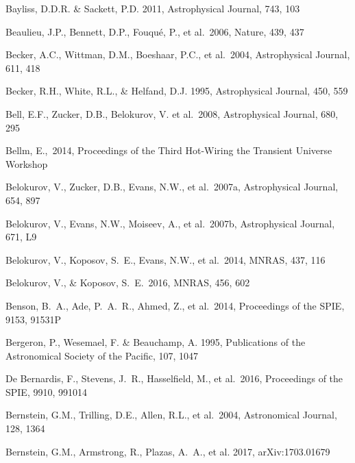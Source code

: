 \documentclass[twocolumn]{aastex61}
\begin{document}
\begin{thebibliography}{}
 Bayliss, D.D.R. \& Sackett, P.D. 2011, Astrophysical Journal, 743, 103

 Beaulieu, J.P., Bennett, D.P., Fouqu\'{e}, P., et al.~2006, Nature, 439, 437

 Becker, A.C., Wittman, D.M., Boeshaar, P.C., et al.~2004, Astrophysical Journal, 611, 418

 Becker, R.H., White, R.L., \& Helfand, D.J. 1995, Astrophysical Journal, 450, 559

 Bell, E.F., Zucker, D.B., Belokurov, V. et al.~2008, Astrophysical Journal, 680, 295

 Bellm, E.,~2014, Proceedings of the Third Hot-Wiring the Transient Universe Workshop

 Belokurov, V., Zucker, D.B., Evans, N.W., et al.~2007a, Astrophysical Journal, 654, 897

 Belokurov, V., Evans, N.W., Moiseev, A., et al.~2007b, Astrophysical Journal, 671, L9

 Belokurov, V., Koposov, S.~E., Evans, N.W., et al.~2014, MNRAS, 437, 116

 Belokurov, V., \& Koposov, S.~E.\ 2016, MNRAS, 456, 602

 Benson, B.~A., Ade, P.~A.~R., Ahmed, Z., et al.\ 2014, Proceedings of the SPIE, 9153, 91531P

 Bergeron, P., Wesemael, F. \& Beauchamp, A. 1995, Publications of the Astronomical Society of the Pacific, 107, 1047

 De Bernardis, F., Stevens, J.~R., Hasselfield, M., et al.\ 2016, Proceedings of the SPIE, 9910, 991014

 Bernstein, G.M., Trilling, D.E., Allen, R.L., et al.~2004, Astronomical Journal, 128, 1364

 Bernstein, G.M., Armstrong, R., Plazas, A.~A., et al. 2017, arXiv:1703.01679


\end{thebibliography}
\end{document}
